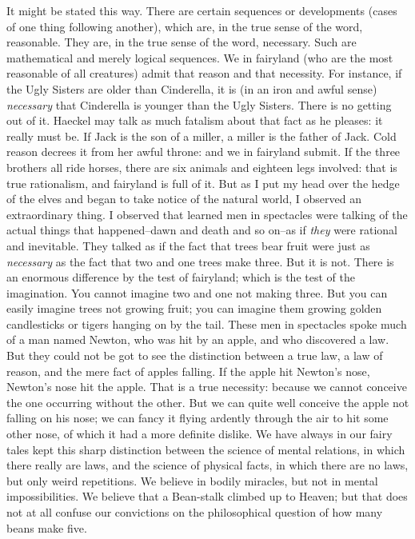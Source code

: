 \documentclass{book}
\begin{document}
It might be stated this way. There are certain sequences or developments (cases of one thing following another), which are, in the true sense of the word, reasonable. They are, in the true sense of the word, necessary. Such are mathematical and merely logical sequences. We in fairyland (who are the most reasonable of all creatures) admit that reason and that necessity. For instance, if the Ugly Sisters are older than Cinderella, it is (in an iron and awful sense) \emph{necessary} that Cinderella is younger than the Ugly Sisters. There is no getting out of it. Haeckel may talk as much fatalism about that fact as he pleases: it really must be. If Jack is the son of a miller, a miller is the father of Jack. Cold reason decrees it from her awful throne: and we in fairyland submit. If the three brothers all ride horses, there are six animals and eighteen legs involved: that is true rationalism, and fairyland is full of it. But as I put my head over the hedge of the elves and began to take notice of the natural world, I observed an extraordinary thing. I observed that learned men in spectacles were talking of the actual things that happened–dawn and death and so on–as if \emph{they} were rational and inevitable. They talked as if the fact that trees bear fruit were just as \emph{necessary} as the fact that two and one trees make three. But it is not. There is an enormous difference by the test of fairyland; which is the test of the imagination. You cannot imagine two and one not making three. But you can easily imagine trees not growing fruit; you can imagine them growing golden candlesticks or tigers hanging on by the tail. These men in spectacles spoke much of a man named Newton, who was hit by an apple, and who discovered a law. But they could not be got to see the distinction between a true law, a law of reason, and the mere fact of apples falling. If the apple hit Newton’s nose, Newton’s nose hit the apple. That is a true necessity: because we cannot conceive the one occurring without the other. But we can quite well conceive the apple not falling on his nose; we can fancy it flying ardently through the air to hit some other nose, of which it had a more definite dislike. We have always in our fairy tales kept this sharp distinction between the science of mental relations, in which there really are laws, and the science of physical facts, in which there are no laws, but only weird repetitions. We believe in bodily miracles, but not in mental impossibilities. We believe that a Bean-stalk climbed up to Heaven; but that does not at all confuse our convictions on the philosophical question of how many beans make five.
\end{document}
